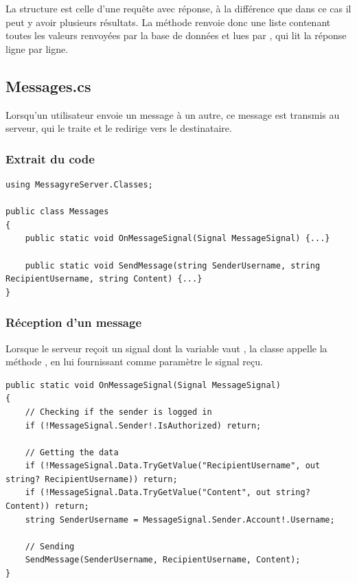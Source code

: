 \documentclass[12pt]{report}
\begin{document}
La structure est celle d’une requête avec réponse, à la différence que dans ce cas il peut y avoir plusieurs résultats. La méthode renvoie donc une liste  contenant toutes les valeurs renvoyées par la base de données et lues par , qui lit la réponse ligne par ligne.

\subsection{Messages.cs}

Lorsqu’un utilisateur envoie un message à un autre, ce message est transmis au serveur, qui le traite et le redirige vers le destinataire.

\subsubsection{Extrait du code}

\begin{verbatim}
using MessagyreServer.Classes;

public class Messages
{
	public static void OnMessageSignal(Signal MessageSignal) {...}
	
	public static void SendMessage(string SenderUsername, string RecipientUsername, string Content) {...}
}
\end{verbatim}

\subsubsection{Réception d’un message}

Lorsque le serveur reçoit un signal dont la variable  vaut , la classe  appelle la méthode , en lui fournissant comme paramètre le signal reçu.

\begin{verbatim}
public static void OnMessageSignal(Signal MessageSignal)
{
	// Checking if the sender is logged in
	if (!MessageSignal.Sender!.IsAuthorized) return;
	
	// Getting the data
	if (!MessageSignal.Data.TryGetValue("RecipientUsername", out string? RecipientUsername)) return;
	if (!MessageSignal.Data.TryGetValue("Content", out string? Content)) return;
	string SenderUsername = MessageSignal.Sender.Account!.Username;
	
	// Sending
	SendMessage(SenderUsername, RecipientUsername, Content);
}
\end{verbatim}
\end{document}
